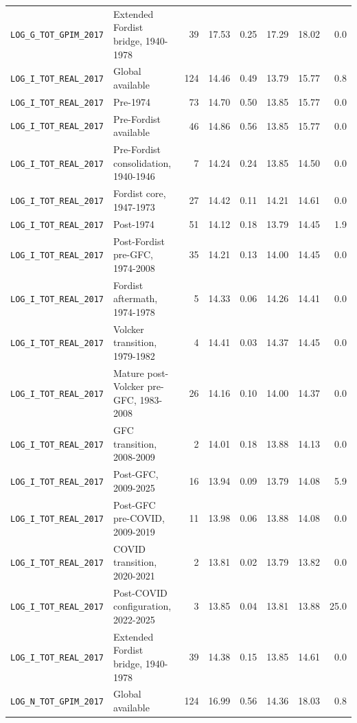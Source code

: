 \begin{landscape}
\begin{longtable}{p{4.4cm}p{3.8cm}rrrrrr}
\\
\nolinkurl{LOG_G_TOT_GPIM_2017} & Extended Fordist bridge, 1940-1978 & 39 & 17.53 & 0.25 & 17.29 & 18.02 & 0.0
\\
\nolinkurl{LOG_I_TOT_REAL_2017} & Global available & 124 & 14.46 & 0.49 & 13.79 & 15.77 & 0.8
\\
\nolinkurl{LOG_I_TOT_REAL_2017} & Pre-1974 & 73 & 14.70 & 0.50 & 13.85 & 15.77 & 0.0
\\
\nolinkurl{LOG_I_TOT_REAL_2017} & Pre-Fordist available & 46 & 14.86 & 0.56 & 13.85 & 15.77 & 0.0
\\
\nolinkurl{LOG_I_TOT_REAL_2017} & Pre-Fordist consolidation, 1940-1946 & 7 & 14.24 & 0.24 & 13.85 & 14.50 & 0.0
\\
\nolinkurl{LOG_I_TOT_REAL_2017} & Fordist core, 1947-1973 & 27 & 14.42 & 0.11 & 14.21 & 14.61 & 0.0
\\
\nolinkurl{LOG_I_TOT_REAL_2017} & Post-1974 & 51 & 14.12 & 0.18 & 13.79 & 14.45 & 1.9
\\
\nolinkurl{LOG_I_TOT_REAL_2017} & Post-Fordist pre-GFC, 1974-2008 & 35 & 14.21 & 0.13 & 14.00 & 14.45 & 0.0
\\
\nolinkurl{LOG_I_TOT_REAL_2017} & Fordist aftermath, 1974-1978 & 5 & 14.33 & 0.06 & 14.26 & 14.41 & 0.0
\\
\nolinkurl{LOG_I_TOT_REAL_2017} & Volcker transition, 1979-1982 & 4 & 14.41 & 0.03 & 14.37 & 14.45 & 0.0
\\
\nolinkurl{LOG_I_TOT_REAL_2017} & Mature post-Volcker pre-GFC, 1983-2008 & 26 & 14.16 & 0.10 & 14.00 & 14.37 & 0.0
\\
\nolinkurl{LOG_I_TOT_REAL_2017} & GFC transition, 2008-2009 & 2 & 14.01 & 0.18 & 13.88 & 14.13 & 0.0
\\
\nolinkurl{LOG_I_TOT_REAL_2017} & Post-GFC, 2009-2025 & 16 & 13.94 & 0.09 & 13.79 & 14.08 & 5.9
\\
\nolinkurl{LOG_I_TOT_REAL_2017} & Post-GFC pre-COVID, 2009-2019 & 11 & 13.98 & 0.06 & 13.88 & 14.08 & 0.0
\\
\nolinkurl{LOG_I_TOT_REAL_2017} & COVID transition, 2020-2021 & 2 & 13.81 & 0.02 & 13.79 & 13.82 & 0.0
\\
\nolinkurl{LOG_I_TOT_REAL_2017} & Post-COVID configuration, 2022-2025 & 3 & 13.85 & 0.04 & 13.81 & 13.88 & 25.0
\\
\nolinkurl{LOG_I_TOT_REAL_2017} & Extended Fordist bridge, 1940-1978 & 39 & 14.38 & 0.15 & 13.85 & 14.61 & 0.0
\\
\nolinkurl{LOG_N_TOT_GPIM_2017} & Global available & 124 & 16.99 & 0.56 & 14.36 & 18.03 & 0.8

\end{longtable}
\end{landscape}

